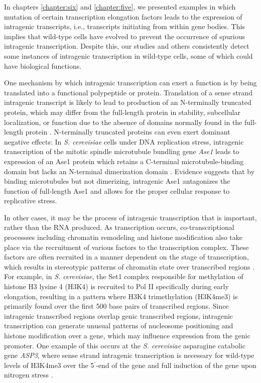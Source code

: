 In chapters \ref{chapter:six} and \ref{chapter:five}, we presented examples in which mutation of certain transcription elongation factors leads to the expression of intragenic transcripts, i.e., transcripts initiating from within gene bodies.
This implies that wild-type cells have evolved to prevent the occurrence of spurious intragenic transcription.
Despite this, our studies and others \citep{malabat2015, pelechano2013a} consistently detect some instances of intragenic transcription in wild-type cells, some of which could have biological functions.

One mechanism by which intragenic transcription can exert a function is by being translated into a functional polypeptide or protein.
Translation of a sense strand intragenic transcript is likely to lead to production of an N-terminally truncated protein, which may differ from the full-length protein in stability, subcellular localization, or function due to the absence of domains normally found in the full-length protein \citep{benanti2009, gammie1999, mcknight2014}.
N-terminally truncated proteins can even exert dominant negative effects: In \textit{S. cerevisiae} cells under DNA replication stress, intragenic transcription of the mitotic spindle microtubule bundling gene \textit{Ase1} leads to expression of an Ase1 protein which retains a C-terminal microtubule-binding domain but lacks an N-terminal dimerization domain \citep{mcknight2014}.
Evidence suggests that by binding microtubules but not dimerizing, intragenic Ase1 antagonizes the function of full-length Ase1 and allows for the proper cellular response to replicative stress.

In other cases, it may be the process of intragenic transcription that is important, rather than the RNA produced.
As transcription occurs, co-transcriptional processses including chromatin remodeling and histone modification also take place via the recruitment of various factors to the transcription complex.
These factors are often recruited in a manner dependent on the stage of transcription, which results in stereotypic patterns of chromatin state over transcribed regions \citep{smolle2013, buratowski2010}.
For example, in \textit{S. cerevisiae}, the Set1 complex responsible for methylation of histone H3 lysine 4 (H3K4) is recruited to Pol II specifically during early elongation, resulting in a pattern where H3K4 trimethylation (H3K4me3) is primarily found over the first 500 base pairs of transcribed regions.
Since intragenic transcribed regions overlap genic transcribed regions, intragenic transcription can generate unusual patterns of nucleosome positioning and histone modification over a gene, which may influence expression from the genic promoter.
One example of this occurs at the \textit{S. cerevisiae} asparagine catabolic gene \textit{ASP3}, where sense strand intragenic transcription is necessary for wild-type levels of H3K4me3 over the 5$^\prime$-end of the gene and full induction of the gene upon nitrogen stress \citep{huang2010}.

